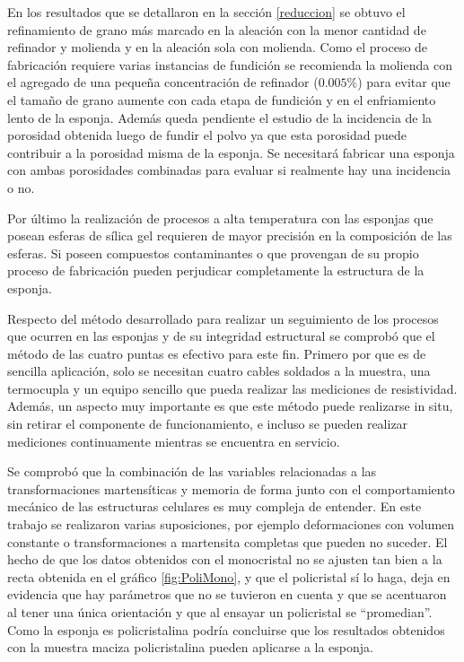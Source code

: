 \documentclass[a4paper,12pt,fleqn,twoside,openany]{book}
\begin{document}
 En los resultados que se detallaron en la sección \ref{reduccion} se obtuvo el refinamiento de grano más marcado en la aleación con la menor cantidad de refinador y molienda y en la aleación sola con molienda. Como el proceso de fabricación requiere varias instancias de fundición se recomienda la molienda con el agregado de una pequeña concentración de refinador ($0.005\%$) para evitar que el tamaño de grano aumente con cada etapa de fundición y en el enfriamiento lento de la esponja. Además queda pendiente el estudio de la incidencia de la porosidad obtenida luego de fundir el polvo ya que esta porosidad puede contribuir a la porosidad misma de la esponja. Se necesitará fabricar una esponja con ambas porosidades combinadas para evaluar si realmente hay una incidencia o no. 
 
 Por último la realización de procesos a alta temperatura con las esponjas que posean esferas de sílica gel requieren de mayor precisión en la composición de las esferas. Si poseen compuestos contaminantes o que provengan de su propio proceso de fabricación pueden perjudicar completamente la estructura de la esponja. 

Respecto del método desarrollado para realizar un seguimiento de los procesos que ocurren en las esponjas y de su integridad estructural se comprobó que el método de las cuatro puntas es efectivo para este fin. Primero por que es de sencilla aplicación, solo se necesitan cuatro cables soldados a la muestra, una termocupla y un equipo sencillo que pueda realizar las mediciones de resistividad. Además, un aspecto muy importante es que este método puede realizarse in situ, sin retirar el componente de funcionamiento, e incluso se pueden realizar mediciones continuamente mientras se encuentra en servicio.

Se comprobó que la combinación de las variables relacionadas a las transformaciones martensíticas y memoria de forma junto con el comportamiento mecánico de las estructuras celulares es muy compleja de entender. En este trabajo se realizaron varias suposiciones, por ejemplo deformaciones con volumen constante o transformaciones a martensita completas que pueden no suceder. El hecho de que los datos obtenidos con el monocristal no se ajusten tan bien a la recta obtenida en el gráfico \ref{fig:PoliMono}, y que el policristal sí lo haga, deja en evidencia que hay parámetros que no se tuvieron en cuenta y que se acentuaron al tener una única orientación y que al ensayar un policristal se ``promedian''. Como la esponja es policristalina podría concluirse que los resultados obtenidos con la muestra maciza policristalina pueden aplicarse a la esponja.
\end{document}
